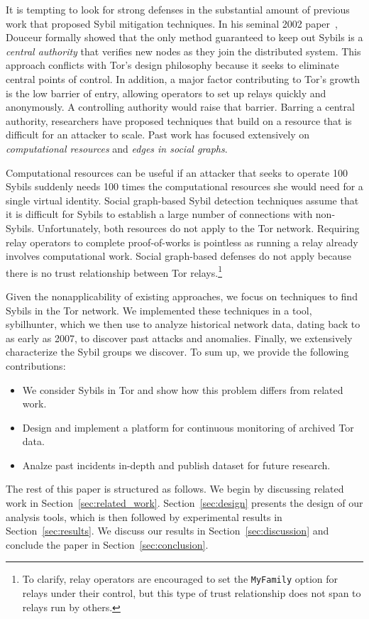 It is tempting to look for strong defenses in the substantial amount of previous
work that proposed Sybil mitigation techniques.  In his seminal 2002
paper~\cite{Douceur2002a}, Douceur formally showed that the only method
guaranteed to keep out Sybils is a \emph{central authority} that verifies new
nodes as they join the distributed system.  This approach conflicts with Tor's
design philosophy because it seeks to eliminate central points of control.  In
addition, a major factor contributing to Tor's growth is the low barrier of
entry, allowing operators to set up relays quickly and anonymously.  A
controlling authority would raise that barrier.  Barring a central authority,
researchers have proposed techniques that build on a resource that is difficult
for an attacker to scale.  Past work has focused extensively on
\emph{computational resources} and \emph{edges in social graphs}.

Computational resources can be useful if an attacker that seeks to
operate 100 Sybils suddenly needs 100 times the computational resources she
would need for a single virtual identity.  Social graph-based Sybil detection
techniques assume that it is difficult for Sybils to establish a large number of
connections with non-Sybils.  Unfortunately, both resources do not apply to the
Tor network. Requiring relay operators to complete proof-of-works is pointless
as running a relay already involves computational work.  Social graph-based
defenses do not apply because there is no trust relationship between Tor
relays.\footnote{To clarify, relay operators are encouraged to set the
\texttt{MyFamily} option for relays under their control, but this type of
trust relationship does not span to relays run by others.}

Given the nonapplicability of existing approaches, we focus on techniques to
find Sybils in the Tor network.  We implemented these techniques in a tool,
sybilhunter, which we then use to analyze historical network data, dating back
to as early as 2007, to discover past attacks and anomalies.  Finally, we
extensively characterize the Sybil groups we discover.  To sum up, we provide
the following contributions:
\begin{itemize}
	\item We consider Sybils in Tor and show how this problem differs from
		related work.
	\item Design and implement a platform for continuous monitoring of archived
		Tor data.
	\item Analze past incidents in-depth and publish dataset for future
		research.
\end{itemize}

The rest of this paper is structured as follows.  We begin by discussing
related work in Section~\ref{sec:related_work}.  Section~\ref{sec:design}
presents the design of our analysis tools, which is then followed by
experimental results in Section~\ref{sec:results}.  We discuss our results in
Section~\ref{sec:discussion} and conclude the paper in
Section~\ref{sec:conclusion}.
